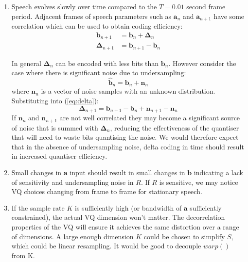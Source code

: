 \documentclass{article}
\begin{document}
\begin{enumerate}
\item Speech evolves slowly over time compared to the $T=0.01$ second frame period.  Adjacent frames of speech parameters such as $\mathbf{a}_n$ and $\mathbf{a}_{n+1}$ have some correlation which can be used to obtain coding efficiency:
\begin{equation} \label{eq:delta}
\begin{split}
\mathbf{b}_{n+1} & = \mathbf{b}_{n} + \mathbf{\Delta}_n \\
\mathbf{\Delta}_{n+1} & = \mathbf{b}_{n+1} - \mathbf{b}_{n}
\end{split}
\end{equation}

In general $\mathbf{\Delta}_n$ can be encoded with less bits than $\mathbf{b}_n$.  However consider the case where there is significant noise due to undersampling:
\begin{equation}
\mathbf{\hat{b}}_n = \mathbf{b}_{n} + \mathbf{n}_{n}
\end{equation}
where $\mathbf{n}_{n}$ is a vector of noise samples with an unknown distribution. Substituting into (\ref{eq:delta}):
\begin{equation}
\mathbf{\Delta}_{n+1} = \mathbf{b}_{n+1} - \mathbf{b}_{n} + \mathbf{n}_{n+1} - \mathbf{n}_{n}
\end{equation}
If $\mathbf{n}_{n}$ and $\mathbf{n}_{n+1}$ are not well correlated they may become a significant source of noise that is summed with $\mathbf{\Delta}_{n}$, reducing the effectiveness of the quantiser that will need to waste bits quantising the noise. We would therefore expect that in the absence of undersampling noise, delta coding in time should result in increased quantiser efficiency.

\item Small changes in $\mathbf{a}$ input should result in small changes in $\mathbf{b}$ indicating a lack of sensitivity and undersampling noise in $R$.  If $R$ is sensitive, we may notice VQ choices changing from frame to frame for stationary speech.

\item If the sample rate $K$ is sufficiently high (or bandwidth of $\mathbf{a}$ sufficiently constrained), the actual VQ dimension won't matter.  The decorrelation properties of the VQ will ensure it achieves the same distortion over a range of dimensions.  A large enough dimension $K$ could be chosen to simplify $S$, which could be linear resampling. It would be good to decouple $warp()$ from K.
\end{enumerate}
\end{document}
